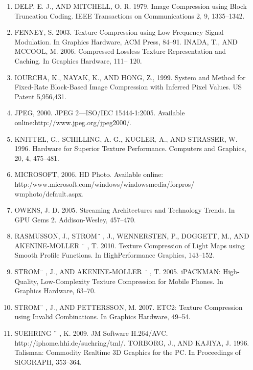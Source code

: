 \documentclass{article}
\begin{document}
\begin{enumerate}
	\item DELP, E. J., AND MITCHELL, O. R. 1979. Image Compression
	using Block Truncation Coding. IEEE Transactions on Communications 2, 9, 1335–1342.

	\item FENNEY, S. 2003. Texture Compression using Low-Frequency
	Signal Modulation. In Graphics Hardware, ACM Press, 84–91.
	INADA, T., AND MCCOOL, M. 2006. Compressed Lossless Texture Representation and Caching. In Graphics Hardware, 111–	120.

	\item IOURCHA, K., NAYAK, K., AND HONG, Z., 1999. System and
	Method for Fixed-Rate Block-Based Image Compression with
	Inferred Pixel Values. US Patent 5,956,431.	
	
	\item JPEG, 2000. JPEG 2—ISO/IEC 15444-1:2005. Available online:http://www.jpeg.org/jpeg2000/.
	
	\item KNITTEL, G., SCHILLING, A. G., KUGLER, A., AND STRASSER, W. 1996. Hardware for Superior Texture Performance. Computers and Graphics, 20, 4, 475–481.
	
	\item MICROSOFT, 2006. HD Photo. Available online:
	http:/www.microsoft.com/windows/windowsmedia/forpros/
	wmphoto/default.aspx.

	\item OWENS, J. D. 2005. Streaming Architectures and Technology
	Trends. In GPU Gems 2. Addison-Wesley, 457–470.

	\item RASMUSSON, J., STROM¨ , J., WENNERSTEN, P., DOGGETT,
	M., AND AKENINE-MOLLER ¨ , T. 2010. Texture Compression of Light Maps using Smooth Profile Functions. In HighPerformance Graphics, 143–152.

	\item STROM¨ , J., AND AKENINE-MOLLER ¨ , T. 2005. iPACKMAN:
	High-Quality, Low-Complexity Texture Compression for Mobile Phones. In Graphics Hardware, 63–70.
	\item STROM¨ , J., AND PETTERSSON, M. 2007. ETC2: Texture Compression using Invalid Combinations. In Graphics Hardware,
	49–54.
	
	\item SUEHRING ¨ , K. 2009. JM Software H.264/AVC.
	http://iphome.hhi.de/suehring/tml/.
	TORBORG, J., AND KAJIYA, J. 1996. Talisman: Commodity Realtime 3D Graphics for the PC. In Proceedings of SIGGRAPH,
	353–364.
	

\end{enumerate}
\end{document}
